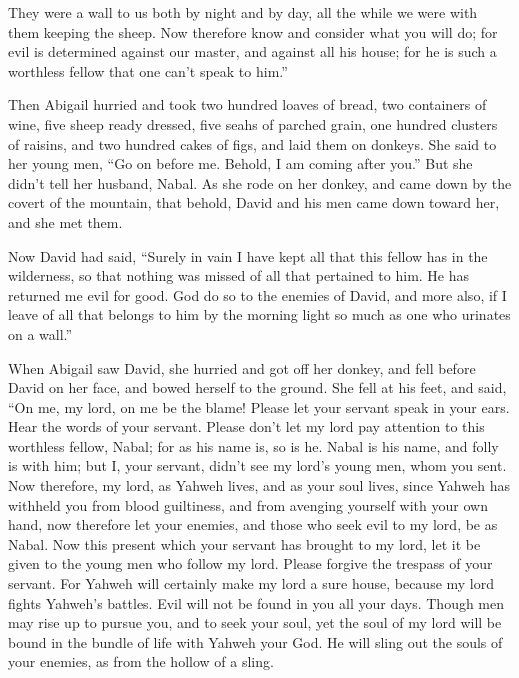 {They were a wall to us both by night and by day, all the while we were with them keeping the sheep.
Now therefore know and consider what you will do; for evil is determined against our master, and against all his house; for he is such a worthless fellow that one can’t speak to him.”
\par }{\PP {}Then Abigail hurried and took two hundred loaves of bread, two containers of wine, five sheep ready dressed, five seahs of parched grain, one hundred clusters of raisins, and two hundred cakes of figs, and laid them on donkeys.
She said to her young men, “Go on before me. Behold, I am coming after you.” But she didn’t tell her husband, Nabal.
As she rode on her donkey, and came down by the covert of the mountain, that behold, David and his men came down toward her, and she met them.
\par }{\PP {}Now David had said, “Surely in vain I have kept all that this fellow has in the wilderness, so that nothing was missed of all that pertained to him. He has returned me evil for good.
God do so to the enemies of David, and more also, if I leave of all that belongs to him by the morning light so much as one who urinates on a wall.”
\par }{\PP {}When Abigail saw David, she hurried and got off her donkey, and fell before David on her face, and bowed herself to the ground.
She fell at his feet, and said, “On me, my lord, on me be the blame! Please let your servant speak in your ears. Hear the words of your servant.
Please don’t let my lord pay attention to this worthless fellow, Nabal; for as his name is, so is he. Nabal is his name, and folly is with him; but I, your servant, didn’t see my lord’s young men, whom you sent.
Now therefore, my lord, as Yahweh lives, and as your soul lives, since Yahweh has withheld you from blood guiltiness, and from avenging yourself with your own hand, now therefore let your enemies, and those who seek evil to my lord, be as Nabal.
Now this present which your servant has brought to my lord, let it be given to the young men who follow my lord.
Please forgive the trespass of your servant. For Yahweh will certainly make my lord a sure house, because my lord fights Yahweh’s battles. Evil will not be found in you all your days.
Though men may rise up to pursue you, and to seek your soul, yet the soul of my lord will be bound in the bundle of life with Yahweh your God. He will sling out the souls of your enemies, as from the hollow of a sling.
}
